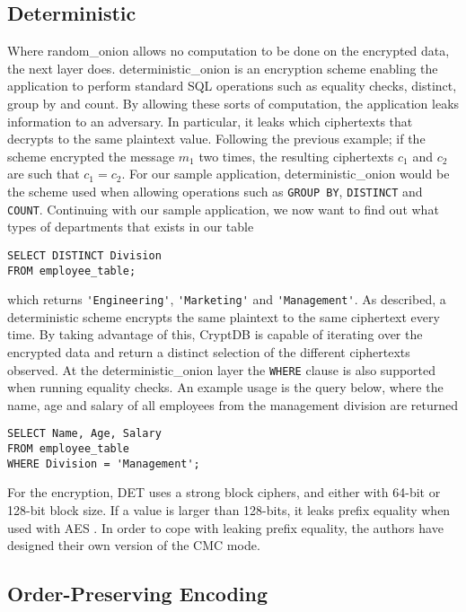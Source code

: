 \subsection{Deterministic}
Where \Gls{random_onion} allows no computation to be done on the encrypted data, the next layer does. \Gls{deterministic_onion} is an encryption scheme enabling the application to perform standard SQL operations such as equality checks, distinct, group by and count. By allowing these sorts of computation, the application leaks information to an adversary. In particular, it leaks which ciphertexts that decrypts to the same plaintext value. Following the previous example; if the scheme encrypted the message $m_1$ two times, the resulting ciphertexts $c_1$ and $c_2$ are such that $c_1 = c_2$. For our sample application, \Gls{deterministic_onion} would be the scheme used when allowing operations such as \verb!GROUP BY!, \verb!DISTINCT! and \verb!COUNT!. Continuing with our sample application, we now want to find out what types of departments that exists in our table

\begin{verbatim}
SELECT DISTINCT Division
FROM employee_table;
\end{verbatim}
\noindent
which returns \verb!'Engineering'!, \verb!'Marketing'! and \verb!'Management'!. As described, a deterministic scheme encrypts the same plaintext to the same ciphertext every time. By taking advantage of this, CryptDB is capable of iterating over the encrypted data and return a distinct selection of the different ciphertexts observed. At the \gls{deterministic_onion} layer the \verb!WHERE! clause is also supported when running equality checks. An example usage is the query below, where the name, age and salary of all employees from the management division are returned

\begin{verbatim}
SELECT Name, Age, Salary
FROM employee_table
WHERE Division = 'Management';
\end{verbatim}

For the encryption, DET uses a strong block ciphers, and either with 64-bit or 128-bit block size. If a value is larger than 128-bits, it leaks  prefix equality when used with AES \citep{CryptDB_Main_Paper}. In order to cope with leaking prefix equality, the authors have designed their own version of the CMC mode.


\subsection{Order-Preserving Encoding}

